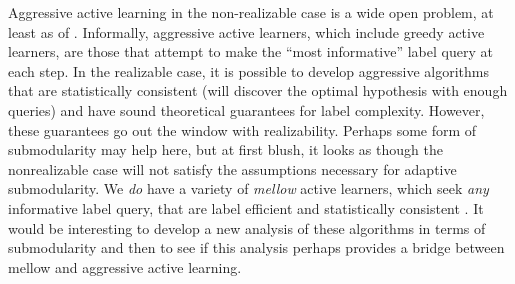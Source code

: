 Aggressive active learning in the non-realizable case is a wide open problem, at least as of \cite{dasgupta2011}. Informally, aggressive active learners, which include greedy active learners, are those that attempt to make the ``most informative'' label query at each step. In the realizable case, it is possible to develop aggressive algorithms that are statistically consistent (will discover the optimal hypothesis with enough queries) and have sound theoretical guarantees for label complexity. However, these guarantees go out the window with realizability. Perhaps some form of submodularity may help here, but at first blush, it looks as though the nonrealizable case will not satisfy the assumptions necessary for adaptive submodularity. We \textit{do} have a variety of \textit{mellow} active learners, which seek \textit{any} informative label query, that are label efficient and statistically consistent \cite{iwalcal} \cite{dasgupta2011}. It would be interesting to develop a new analysis of these algorithms in terms of submodularity and then to see if this analysis perhaps provides a bridge between mellow and aggressive active learning.